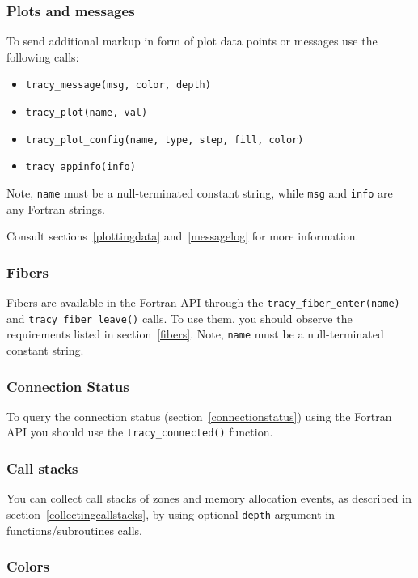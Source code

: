 \documentclass[hidelinks,titlepage,a4paper,twoside]{article}
\begin{document}
\subsubsection{Plots and messages}

To send additional markup in form of plot data points or messages use the following calls:

\begin{itemize}
\item \texttt{tracy\_message(msg, color, depth)}
\item \texttt{tracy\_plot(name, val)}
\item \texttt{tracy\_plot\_config(name, type, step, fill, color)}
\item \texttt{tracy\_appinfo(info)}
\end{itemize}

Note, \texttt{name} must be a null-terminated constant string, while \texttt{msg} and \texttt{info} are any Fortran strings.

Consult sections~\ref{plottingdata} and~\ref{messagelog} for more information.

\subsubsection{Fibers}

Fibers are available in the Fortran API through the \texttt{tracy\_fiber\_enter(name)} and \texttt{tracy\_fiber\_leave()} calls. To use them, you should observe the requirements listed in section~\ref{fibers}.
Note, \texttt{name} must be a null-terminated constant string.

\subsubsection{Connection Status}

To query the connection status (section~\ref{connectionstatus}) using the Fortran API you should use the \texttt{tracy\_connected()} function.

\subsubsection{Call stacks}

You can collect call stacks of zones and memory allocation events, as described in section~\ref{collectingcallstacks}, by using optional \texttt{depth} argument in functions/subroutines calls.

\subsubsection{Colors}
\end{document}

